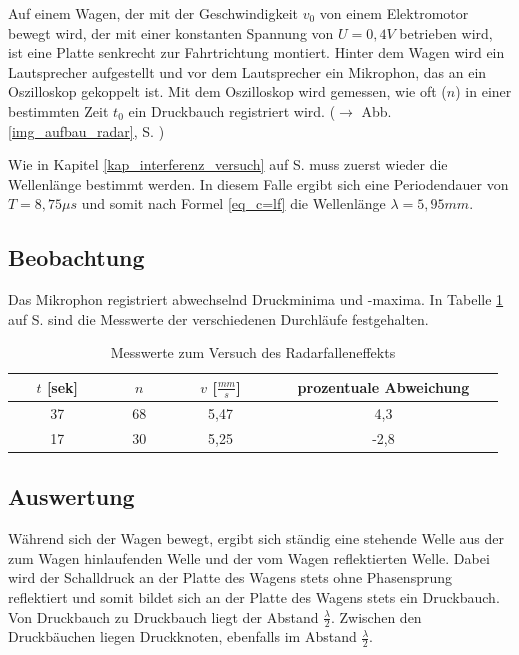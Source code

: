 Auf einem Wagen, der mit der Geschwindigkeit \(v_0\) von einem Elektromotor bewegt wird, der mit einer konstanten Spannung von \(U = 0,4 V\) betrieben wird, ist eine Platte senkrecht zur Fahrtrichtung montiert. Hinter dem Wagen wird ein Lautsprecher aufgestellt und vor dem Lautsprecher ein Mikrophon, das an ein Oszilloskop gekoppelt ist.
Mit dem Oszilloskop wird gemessen, wie oft (\(n\)) in einer bestimmten Zeit \(t_0\) ein Druckbauch registriert wird.
(\(\rightarrow\) Abb. \ref{img_aufbau_radar}, S. \pageref{img_aufbau_radar})


Wie in Kapitel \ref{kap_interferenz_versuch} auf S. \pageref{kap_interferenz_versuch} muss zuerst wieder die Wellenlänge bestimmt werden. In diesem Falle ergibt sich eine Periodendauer von \(T = 8,75 \mu s\) und somit nach Formel \ref{eq_c=lf} die Wellenlänge \(\lambda = 5,95mm\).




		\subsection{Beobachtung}

Das Mikrophon registriert abwechselnd Druckminima und -maxima. In Tabelle \ref{tab_radarfalle_messwerte} auf S. \pageref{tab_radarfalle_messwerte} sind die Messwerte der verschiedenen Durchläufe festgehalten.


\begin{table}
\centering
   \begin{tabular}{c|c|c|c}
   	~~ \(t\) [sek] ~~ & ~~ \(n\) ~~ & ~~ \(v\) [\(\frac{mm}{s}\)] ~~ & ~~ prozentuale Abweichung ~~\\
   	\hline
   	37 & 68 & 5,47 & 4,3 \\
   	17 & 30 & 5,25 & -2,8 \\
   \end{tabular}
   \caption{Messwerte zum Versuch des Radarfalleneffekts}
   \label{tab_radarfalle_messwerte}

\end{table}





		\subsection{Auswertung}

Während sich der Wagen bewegt, ergibt sich ständig eine stehende Welle aus der zum Wagen hinlaufenden Welle und der vom Wagen reflektierten Welle. Dabei wird der Schalldruck an der Platte des Wagens stets ohne Phasensprung reflektiert und somit bildet sich an der Platte des Wagens stets ein Druckbauch. Von Druckbauch zu Druckbauch liegt der Abstand \(\frac{\lambda}{2}\). Zwischen den Druckbäuchen liegen Druckknoten, ebenfalls im Abstand \(\frac{\lambda}{2}\).

